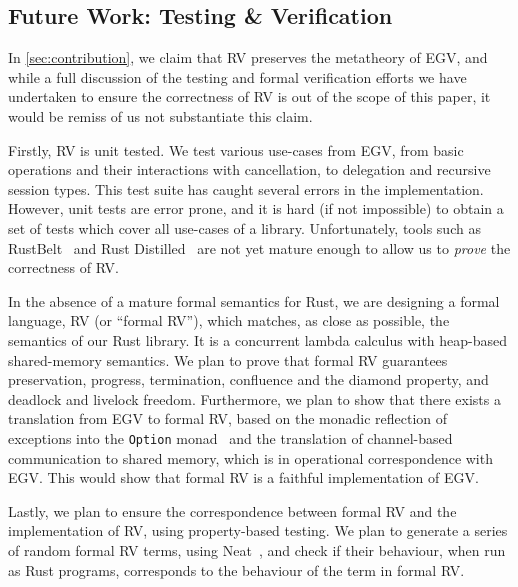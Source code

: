 \documentclass[sigconf,natbib=false]{acmart}
\begin{document}
\subsection{Future Work: Testing \& Verification}\label{sec:verification}
In \cref{sec:contribution}, we claim that RV preserves the metatheory of EGV, and while a full discussion of the testing and formal verification efforts we have undertaken to ensure the correctness of RV is out of the scope of this paper, it would be remiss of us not substantiate this claim.

Firstly, RV is unit tested. We test various use-cases from EGV, from basic operations and their interactions with cancellation, to delegation and recursive session types. This test suite has caught several errors in the implementation. However, unit tests are error prone, and it is hard (if not impossible) to obtain a set of tests which cover all use-cases of a library. Unfortunately, tools such as RustBelt~\parencite{jung2017} and Rust Distilled~\parencite{weiss2018} are not yet mature enough to allow us to \emph{prove} the correctness of RV.

In the absence of a mature formal semantics for Rust, we are designing a formal language, RV (or ``formal RV''), which matches, as close as possible, the semantics of our Rust library. It is a concurrent lambda calculus with heap-based shared-memory semantics. We plan to prove that formal RV guarantees preservation, progress, termination, confluence and the diamond property, and deadlock and livelock freedom. Furthermore, we plan to show that there exists a translation from EGV to formal RV, based on the monadic reflection of exceptions into the \lstinline{Option} monad~\parencite{filinski1994} and the translation of channel-based communication to shared memory, which is in operational correspondence with EGV. This would show that formal RV is a faithful implementation of EGV.

Lastly, we plan to ensure the correspondence between formal RV and the implementation of RV, using property-based testing. We plan to generate a series of random formal RV terms, using Neat~\parencite{claessen2015}, and check if their behaviour, when run as Rust programs, corresponds to the behaviour of the term in formal RV.

\printbibliography
\end{document}
